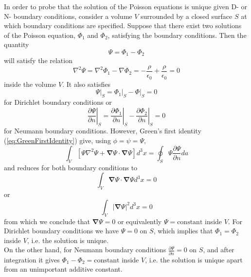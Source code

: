 In order to probe that the solution of the Poisson equations is unique given D- or N- boundary conditions,  consider a volume $V$ surrounded by a closed surface $S$ at which boundary conditions are specified. Suppose that there exist two solutions of the Poisson equation, $\Phi_1$ and $\Phi_2$, satisfying the boundary conditions. Then the quantity 
\begin{equation}
\Psi = \Phi_1 - \Phi_2
\end{equation}
will satisfy the relation
\begin{equation}
\nabla^2 \Psi = \nabla^2 \Phi_1 - \nabla \Phi_2 = -\frac{\rho}{\epsilon_0} + \frac{\rho}{\epsilon_0} = 0
\end{equation}
inside the volume $V$. It also satisfies
\begin{equation}
\left. \Psi \right|_S = \left. \Phi_1 \right|_S - \left. \Phi \right|_S = 0
\end{equation}
for Dirichlet boundary conditions or
\begin{equation}
\left. \frac{\partial \Psi}{\partial n} \right|_S = \left. \frac{\partial \Phi_1}{\partial n} \right|_S - \left. \frac{\partial \Phi_2}{\partial n} \right|_S = 0
\end{equation}
for Neumann boundary conditions. However, Green's first identity (\ref{eq:GreenFirstIdentity}) give, using $\phi = \psi = \Psi$,
\begin{equation}
\int_V \left[ \Psi \nabla^2 \Psi +\boldsymbol{\nabla} \Psi \cdot \boldsymbol{\nabla} \Psi \right] d^3x = \oint_S \Psi \frac{\partial \Psi}{\partial n} da
\end{equation}
and reduces for both boundary conditions to
\begin{equation}
\int_V \boldsymbol{\nabla} \Psi \cdot \boldsymbol{\nabla} \Psi  d^3x = 0
\end{equation}
or
\begin{equation}
\int_V \left| \boldsymbol{\nabla} \Psi \right|^2 d^3x = 0
\end{equation}
from which we conclude that $\boldsymbol{\nabla} \Psi =0$ or equivalently $\Psi = \textrm{constant}$ inside $V$. For Dirichlet boundary conditions we have $\Psi=0$ on $S$, which implies that $\Phi_1 = \Phi_2$ inside $V$, i.e. the solution is unique.\\
On the other hand, for Neumann boundary conditions $\frac{\partial \Psi}{\partial n} =0$ on $S$, and after integration it gives $\Phi_1 - \Phi_2 = \textrm{constant}$ inside $V$, i.e. the solution is unique apart from an unimportant additive constant.


